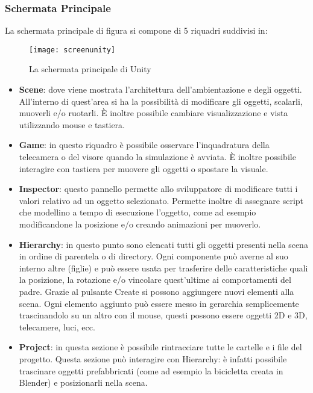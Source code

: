 \subsubsection{Schermata Principale} 
La schermata principale di figura  si compone di 5 riquadri suddivisi in:
 \begin{figure}[htb]
    \centering
    \vspace{-0.7cm}
    \texttt{[image: screenunity]}
    \caption{La schermata principale di Unity\label{fig:screenunity}}
    \vspace{-0.3cm}
\end{figure}

\begin{itemize}
  \item \textbf{Scene}: dove viene mostrata l'architettura dell'ambientazione e degli oggetti. All'interno di quest'area si ha la possibilità di modificare gli oggetti, scalarli, muoverli e/o ruotarli. È inoltre possibile cambiare visualizzazione e vista utilizzando mouse e tastiera.
 \item \textbf{Game}: in questo riquadro è possibile osservare l'inquadratura della telecamera o del visore quando la simulazione è avviata. È inoltre possibile interagire con tastiera per muovere gli oggetti o spostare la visuale.
  \item \textbf{Inspector}: questo pannello permette allo sviluppatore di modificare tutti i valori relativo ad un oggetto selezionato. Permette inoltre di assegnare script che modellino a tempo di esecuzione l'oggetto, come ad esempio modificandone la posizione e/o creando animazioni per muoverlo. 
  \item \textbf{Hierarchy}: in questo punto sono elencati tutti gli oggetti presenti nella scena in ordine di parentela o di directory. Ogni componente può averne al suo interno altre (figlie) e può essere usata per trasferire delle caratteristiche quali la posizione, la rotazione e/o vincolare quest'ultime ai comportamenti del padre. Grazie al pulsante Create si possono aggiungere nuovi elementi alla scena. Ogni elemento aggiunto può essere messo in gerarchia semplicemente trascinandolo su un altro con il mouse, questi possono essere oggetti 2D e 3D, telecamere, luci, ecc.
    \item \textbf{Project}: in questa sezione è possibile rintracciare tutte le cartelle e i file del progetto. Questa sezione può interagire con Hierarchy: è infatti possibile trascinare oggetti prefabbricati (come ad esempio la bicicletta creata in Blender) e posizionarli nella scena.
\end{itemize}
